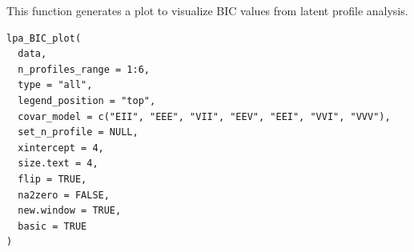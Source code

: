 \documentclass[a4paper]{book}
\begin{document}
%
\begin{Examples}
\end{Examples}
%
\begin{Description}
This function generates a plot to visualize BIC values from latent profile analysis.
\end{Description}
%
\begin{Usage}
\begin{verbatim}
lpa_BIC_plot(
  data,
  n_profiles_range = 1:6,
  type = "all",
  legend_position = "top",
  covar_model = c("EII", "EEE", "VII", "EEV", "EEI", "VVI", "VVV"),
  set_n_profile = NULL,
  xintercept = 4,
  size.text = 4,
  flip = TRUE,
  na2zero = FALSE,
  new.window = TRUE,
  basic = TRUE
)
\end{verbatim}
\end{Usage}
%
\end{document}
